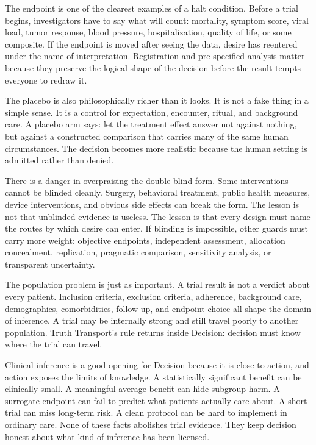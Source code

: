 The endpoint is one of the clearest examples of a halt condition.
Before a trial begins, investigators have to say what will count: mortality,
symptom score, viral load, tumor response, blood pressure, hospitalization,
quality of life, or some composite. If the endpoint is moved after seeing the
data, desire has reentered under the name of interpretation. Registration and
pre-specified analysis matter because they preserve the logical
shape of the decision before the result tempts everyone to redraw it.

The placebo is also philosophically richer than it looks. It is not a fake
thing in a simple sense. It is a control for expectation, encounter, ritual,
and background care. A placebo arm says: let the treatment effect answer not
against nothing, but against a constructed comparison that carries many of
the same human circumstances. The decision becomes more realistic because the
human setting is admitted rather than denied.

There is a danger in overpraising the double-blind form. Some interventions
cannot be blinded cleanly. Surgery, behavioral treatment, public health
measures, device interventions, and obvious side effects can break the form.
The lesson is not that unblinded evidence is useless. The lesson is that
every design must name the routes by which desire can enter. If blinding is
impossible, other guards must carry more weight: objective endpoints,
independent assessment, allocation concealment, replication, pragmatic
comparison, sensitivity analysis, or transparent uncertainty.

The population problem is just as important. A trial result is not a verdict
about every patient. Inclusion criteria, exclusion criteria, adherence,
background care, demographics, comorbidities, follow-up, and endpoint choice
all shape the domain of inference. A trial may be internally strong and still
travel poorly to another population. Truth Transport's rule returns inside
Decision: decision must know where the trial can travel.

Clinical inference is a good opening for Decision because it is close to
action, and action exposes the limits of knowledge. A statistically
significant benefit can be clinically small. A meaningful average benefit can
hide subgroup harm. A surrogate endpoint can fail to predict what patients
actually care about. A short trial can miss long-term risk. A clean protocol
can be hard to implement in ordinary care. None of these facts abolishes
trial evidence. They keep decision honest about what kind of inference has
been licensed.

